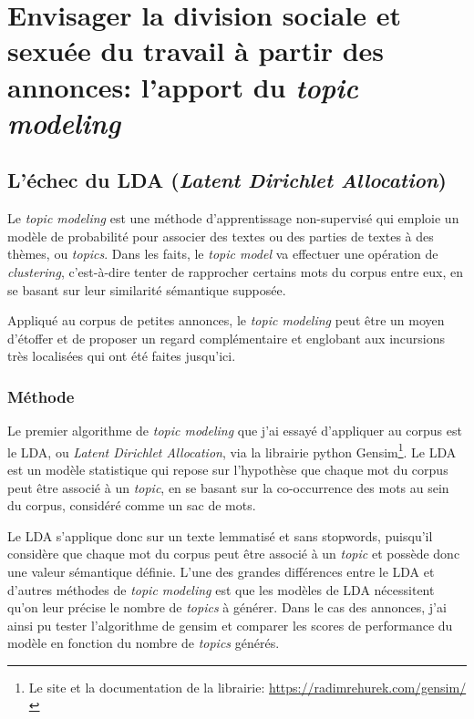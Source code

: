 \part{Envisager la division sociale et sexuée du travail à partir des annonces: l'apport du \textit{topic modeling}}


\chapter{L'échec du LDA (\textit{Latent Dirichlet Allocation})}


Le \textit{topic modeling} est une méthode d'apprentissage non-supervisé qui emploie un modèle de probabilité pour associer des textes ou des parties de textes à des thèmes, ou \textit{topics}. Dans les faits, le \textit{topic model} va effectuer une opération de \textit{clustering}, c'est-à-dire tenter de rapprocher certains mots du corpus entre eux, en se basant sur leur similarité sémantique supposée. 

Appliqué au corpus de petites annonces, le \textit{topic modeling} peut être un moyen d'étoffer et de proposer un regard complémentaire et englobant aux incursions très localisées qui ont été faites jusqu'ici. 

\section{Méthode}


Le premier algorithme de \textit{topic modeling} que j'ai essayé d'appliquer au corpus est le LDA, ou \textit{Latent Dirichlet Allocation}, via la librairie python Gensim\footnote{Le site et la documentation de la librairie: \url{https://radimrehurek.com/gensim/}}. Le LDA est un modèle statistique qui repose sur l'hypothèse que chaque mot du corpus peut être associé à un \textit{topic}, en se basant sur la co-occurrence des mots au sein du corpus, considéré comme un sac de mots.

Le LDA s'applique donc sur un texte lemmatisé et sans stopwords, puisqu'il considère que chaque mot du corpus peut être associé à un \textit{topic} et possède donc une valeur sémantique définie. L'une des grandes différences entre le LDA et d'autres méthodes de \textit{topic modeling} est que les modèles de LDA nécessitent qu'on leur précise le nombre de \textit{topics} à générer. Dans le cas des annonces, j'ai ainsi pu tester l'algorithme de gensim et comparer les scores de performance du modèle en fonction du nombre de \textit{topics} générés. 

